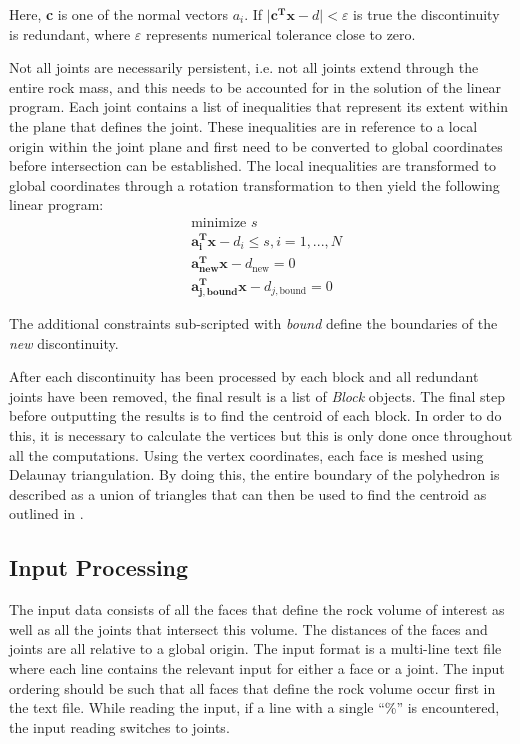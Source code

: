 Here, \textbf{c} is one of the normal vectors $a_{i}$. If $\vert \boldsymbol{c^{T} x} - d \vert < \varepsilon$ is true the discontinuity is redundant, where $\varepsilon$ represents numerical tolerance close to zero. \par

Not all joints are necessarily persistent, i.e. not all joints extend through the entire rock mass, and this needs to be accounted for in the solution of the linear program. Each joint contains a list of inequalities that represent its extent within the plane that defines the joint. These inequalities are in reference to a local origin within the joint plane and first need to be converted to global coordinates before intersection can be established. The local inequalities are transformed to global coordinates through a rotation transformation to then yield the following linear program: 
\begin{equation}
\begin{aligned} 
&\text{minimize } s\\
&\boldsymbol{a_{i}^{T} x} - d_i \leq s, i = 1,...,N\\
&\boldsymbol{a_{\text{new}}^{T} x} - d_{\text{new}} = 0\\
&\boldsymbol{a_{j,\text{bound}}^{T} x} - d_{j,\text{bound}} = 0
\end{aligned}
\end{equation}

The additional constraints sub-scripted with \textit{bound} define the boundaries of the \textit{new} discontinuity. 

After each discontinuity has been processed by each block and all redundant joints have been removed, the final result is a list of \textit{Block} objects. The final step before outputting the results is to find the centroid of each block. In order to do this, it is necessary to calculate the vertices but this is only done once throughout all the computations. Using the vertex coordinates, each face is meshed using Delaunay triangulation. By doing this, the entire boundary of the polyhedron is described as a union of triangles that can then be used to find the centroid as outlined in \cite{centroid}. 

\subsection{Input Processing}
The input data consists of all the faces that define the rock volume of interest as well as all the joints that intersect this volume. The distances of the faces and joints are all relative to a global origin. The input format is a multi-line text file where each line contains the relevant input for either a face or a joint. The input ordering should be such that all faces that define the rock volume occur first in the text file. While reading the input, if a line with a single ``\%'' is encountered, the input reading switches to joints. \par

